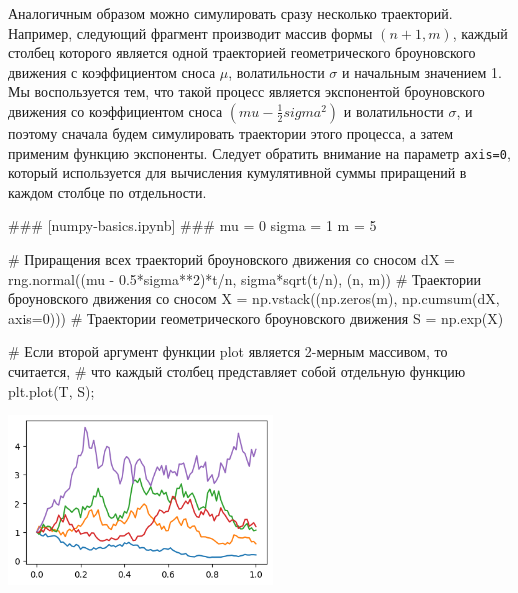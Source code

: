 Аналогичным образом можно симулировать сразу несколько траекторий.
Например, следующий фрагмент производит массив формы $(n+1, m)$, каждый столбец которого является одной траекторией геометрического броуновского движения с коэффициентом сноса $\mu$, волатильности $\sigma$ и начальным значением 1.
Мы воспользуется тем, что такой процесс является экспонентой броуновского движения со коэффициентом сноса $(mu-\frac12 sigma^2)$ и волатильности $\sigma$, и поэтому сначала будем симулировать траектории этого процесса, а затем применим функцию экспоненты. 
Следует обратить внимание на параметр \verb"axis=0", который используется для вычисления кумулятивной суммы приращений в каждом столбце по отдельности.

\begin{python}
### [numpy-basics.ipynb] ###
mu = 0
sigma = 1
m = 5

# Приращения всех траекторий броуновского движения со сносом
dX = rng.normal((mu - 0.5*sigma**2)*t/n, sigma*sqrt(t/n), (n, m))  
# Траектории броуновского движения со сносом
X = np.vstack((np.zeros(m), np.cumsum(dX, axis=0)))
# Траектории геометрического броуновского движения
S = np.exp(X)

# Если второй аргумент функции plot является 2-мерным массивом, то считается,
# что каждый столбец представляет собой отдельную функцию
plt.plot(T, S);
\end{python}

\noindent
\includegraphics[width=7cm]{pic/gbm-paths.png}

